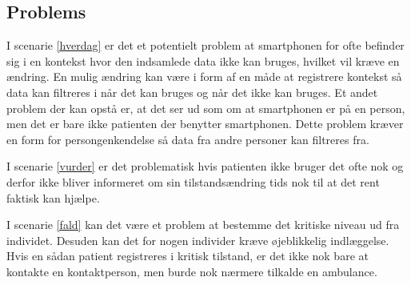 \subsection{Problems}
I scenarie \ref{hverdag} er det et potentielt problem at smartphonen for ofte befinder sig i en kontekst hvor den indsamlede data ikke kan bruges, hvilket vil kræve en ændring.
En mulig ændring kan være i form af en måde at registrere kontekst så data kan filtreres i når det kan bruges og når det ikke kan bruges.
Et andet problem der kan opstå er, at det ser ud som om at smartphonen er på en person, men det er bare ikke patienten der benytter smartphonen.
Dette problem kræver en form for persongenkendelse så data fra andre personer kan filtreres fra.

I scenarie \ref{vurder} er det problematisk hvis patienten ikke bruger det ofte nok og derfor ikke bliver informeret om sin tilstandsændring tids nok til at det rent faktisk kan hjælpe.

I scenarie \ref{fald} kan det være et problem at bestemme det kritiske niveau ud fra individet.
Desuden kan det for nogen individer kræve øjeblikkelig indlæggelse.
Hvis en sådan patient registreres i kritisk tilstand, er det ikke nok bare at kontakte en kontaktperson, men burde nok nærmere tilkalde en ambulance.
